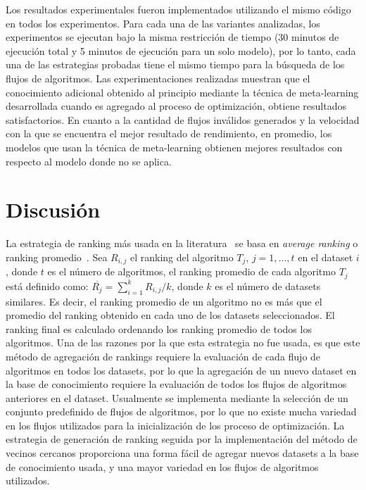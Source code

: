 Los resultados experimentales fueron implementados utilizando el mismo código en todos los experimentos. Para cada una de las variantes analizadas, los experimentos se ejecutan bajo la misma restricción de tiempo (30 minutos de ejecución total y 5 minutos de ejecución para un solo modelo), por lo tanto, cada una de las estrategias probadas tiene el mismo tiempo para la búsqueda de los flujos de algoritmos. Las experimentaciones realizadas muestran que el conocimiento adicional obtenido al principio mediante la técnica de meta-learning desarrollada cuando es agregado al proceso de optimización, obtiene resultados satisfactorios. En cuanto a la cantidad de flujos inválidos generados y la velocidad con la que se encuentra el mejor resultado de rendimiento, en promedio, los modelos que usan la técnica de meta-learning obtienen mejores resultados con respecto al modelo donde no se aplica.



\section{Discusión}\label{sec:discusion}

%
%
%	
%	
%	

La estrategia de ranking más usada en la literatura~\cite{fuerer2015efficient, sun2014MetaLearningAT, bradzil2009metalearning} se basa en \textit{average ranking} o ranking promedio~\cite{bradzil2009metalearning}. Sea $R_{i,j}$ el ranking del algoritmo $T_{j}$, $j=1,...,t$ en el dataset $i$, donde $t$ es el número de algoritmos, el ranking promedio de cada algoritmo $T_{j}$ está definido como: $\overline{R_{j}} = \sum^{k}_{i=1}R_{i,j} / k$, donde $k$ es el número de datasets similares. Es decir, el ranking promedio de un algoritmo no es más que el promedio del ranking obtenido en cada uno de los datasets seleccionados. El ranking final es calculado ordenando los ranking promedio de todos los algoritmos. Una de las razones por la que esta estrategia no fue usada, es que este método de agregación de rankings requiere la evaluación de cada flujo de algoritmos en todos los datasets, por lo que la agregación de un nuevo dataset en la base de conocimiento requiere la evaluación de todos los flujos de algoritmos anteriores en el dataset. Usualmente se implementa mediante la selección de un conjunto predefinido de flujos de algoritmos, por lo que no existe mucha variedad en los flujos utilizados para la inicialización de los proceso de optimización. La estrategia de generación de ranking seguida por la implementación del método de vecinos cercanos proporciona una forma fácil de agregar nuevos datasets a la base de conocimiento usada, y una mayor variedad en los flujos de algoritmos utilizados.

